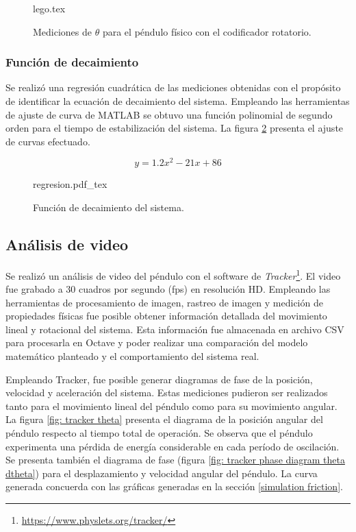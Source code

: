 \begin{figure}[htb!]
 \centering
{lego.tex}
 \caption{Mediciones de $\theta$ para el péndulo físico con el codificador rotatorio.}
 \label{fig: mindstorms theta}
\end{figure}

\subsubsection{Función de decaimiento}

Se realizó una regresión cuadrática de las mediciones obtenidas con el propósito de 
identificar la ecuación de decaimiento del sistema.
Empleando las herramientas de ajuste de curva de MATLAB se obtuvo una función polinomial
de segundo orden para el tiempo de estabilización del sistema.
La figura \ref{fig: regresion} presenta el ajuste de curvas efectuado.

\begin{equation}
 y = 1.2 x^2 - 21 x + 86
\end{equation}

\begin{figure}[htb!]
 \centering
{regresion.pdf_tex}
 \caption{Función de decaimiento del sistema.}
 \label{fig: regresion}
\end{figure}

\pagebreak

\subsection{Análisis de video}

Se realizó un análisis de video del péndulo con 
el software de \emph{Tracker}\footnote{\url{https://www.physlets.org/tracker/}}.
El video fue grabado a 30 cuadros por segundo (fps) en resolución HD.
Empleando las herramientas de procesamiento de imagen, rastreo de imagen y 
 medición de propiedades físicas fue posible 
obtener información detallada del movimiento lineal y rotacional del sistema.
Esta información fue almacenada en archivo CSV para procesarla 
en Octave y poder realizar una comparación del modelo matemático planteado y 
el comportamiento del sistema real.

Empleando Tracker, fue posible generar diagramas de fase de la 
posición, velocidad y aceleración del sistema.
Estas mediciones pudieron ser realizados tanto para el movimiento lineal del
péndulo como para su movimiento angular.
La figura \ref{fig: tracker theta} presenta el diagrama de la posición angular 
del péndulo respecto al tiempo total de operación.
Se observa que el péndulo experimenta una pérdida de energía considerable 
en cada período de oscilación.
Se presenta también el diagrama de fase 
(figura \ref{fig: tracker phase diagram theta dtheta})
para el desplazamiento y velocidad angular del péndulo.
La curva generada concuerda con las gráficas generadas en 
la sección \ref{simulation friction}.

